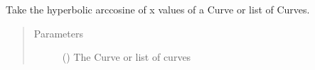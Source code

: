 \documentclass[letterpaper,10pt,english]{sphinxmanual}
\begin{document}
\begin{fulllineitems}
\label{\detokenize{pydv:pydvpy.acoshx}}
Take the hyperbolic arccosine of x values of a Curve or list of Curves.

\begin{sphinxVerbatim}[commandchars=\\\{\}]
  
\end{sphinxVerbatim}

\begin{sphinxVerbatim}[commandchars=\\\{\}]
 
\end{sphinxVerbatim}

\begin{sphinxVerbatim}[commandchars=\\\{\}]
\PYG{p}{[}\PYG{p}{]}
\end{sphinxVerbatim}
\begin{quote}\begin{description}
\item[{Parameters}] \leavevmode
{} ({\hyperref[\detokenize{pydv:curve.Curve}]{}}) \textendash{} The Curve or list of curves

\end{description}\end{quote}

\end{fulllineitems}

\end{document}
